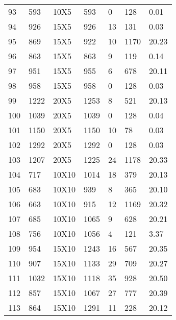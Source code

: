 \documentclass[14pt]{acmsiggraph}
\begin{document}
\begin{table}[h!]
\begin{center}
{\begin{tabular}{||lllllll}
					93  & 593  & 10X5   & \cellcolor[rgb]{0.43,0.67,0.27}593  & 0   & 128  & 0.01  \\
					94  & 926  & 15X5   & \cellcolor[rgb]{0.43,0.67,0.27}926  & 13  & 131  & 0.03  \\
					95  & 869  & 15X5   & \cellcolor[rgb]{0.5,0.7,0.3}922     & 10  & 1170 & 20.23 \\
					96  & 863  & 15X5   & \cellcolor[rgb]{0.43,0.67,0.27}863  & 9   & 119  & 0.14  \\
					97  & 951  & 15X5   & \cellcolor[rgb]{0.44,0.67,0.27}955  & 6   & 678  & 20.11 \\
					98  & 958  & 15X5   & \cellcolor[rgb]{0.43,0.67,0.27}958  & 0   & 128  & 0.03  \\
					99  & 1222 & 20X5   & \cellcolor[rgb]{0.46,0.69,0.29}1253 & 8   & 521  & 20.13 \\
					100 & 1039 & 20X5   & \cellcolor[rgb]{0.43,0.67,0.27}1039 & 0   & 128  & 0.04  \\
					101 & 1150 & 20X5   & \cellcolor[rgb]{0.43,0.67,0.27}1150 & 10  & 78   & 0.03  \\
					102 & 1292 & 20X5   & \cellcolor[rgb]{0.43,0.67,0.27}1292 & 0   & 128  & 0.03  \\
					103 & 1207 & 20X5   & \cellcolor[rgb]{0.45,0.68,0.28}1225 & 24  & 1178 & 20.33 \\
					104 & 717  & 10X10  & \cellcolor[rgb]{0.9,0.87,0.47}1014  & 18  & 379  & 20.13 \\
					105 & 683  & 10X10  & \cellcolor[rgb]{0.85,0.85,0.45}939  & 8   & 365  & 20.10 \\
					106 & 663  & 10X10  & \cellcolor[rgb]{0.86,0.86,0.45}915  & 12  & 1169 & 20.32 \\
					107 & 685  & 10X10  & \cellcolor[rgb]{1,0.82,0.46}1065    & 9   & 628  & 20.21 \\
					108 & 756  & 10X10  & \cellcolor[rgb]{0.88,0.87,0.46}1056 & 4   & 121  & 3.37  \\
					109 & 954  & 15X10  & \cellcolor[rgb]{0.77,0.82,0.41}1243 & 16  & 567  & 20.35 \\
					110 & 907  & 15X10  & \cellcolor[rgb]{0.71,0.79,0.39}1133 & 29  & 709  & 20.27 \\
					111 & 1032 & 15X10  & \cellcolor[rgb]{0.52,0.71,0.31}1118 & 35  & 928  & 20.50 \\
					112 & 857  & 15X10  & \cellcolor[rgb]{0.71,0.79,0.39}1067 & 27  & 777  & 20.39 \\
					113 & 864  & 15X10  & \cellcolor[rgb]{0.99,0.91,0.51}1291 & 11  & 228  & 20.12 \\

\end{tabular}}
\end{center}
\end{table}
\end{document}
